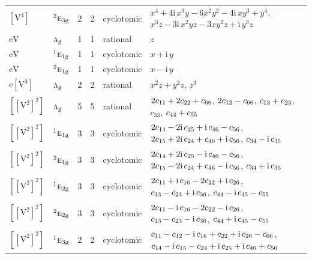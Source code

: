 \documentclass[10pt,a4paper]{article}
\numberwithin{equation}{section}
\newcommand{\irr}[1]{\text{\normalfont\scshape #1}}
\newcommand{\conjpair}[1]{{}^{#1}}
\newcommand{\ptag}[1]{\mathrm{#1}}
\newcommand{\iunit}{\mathrm{i}}
\newcommand{\jahn}[1]{\mathrm{#1}}
\newlength{\fillwidth}\newlength{\cellwidth}\newlength{\colwidth}
\newcommand{\signbreak}{\penalty100\relax}
\begin{document}
{\begin{longtable}{@{}llrrl>{\RaggedRight\arraybackslash}p{\fillwidth}@{}}
$\jahn{[V^{4}]}$ & $\conjpair{2}\irr{e}_{3\ptag{g}}$ & 2 & 2 & cyclotomic & $x^{4} + 4\iunit{}\,x^{3}y - 6x^{2}y^{2} - 4\iunit{}\,xy^{3} + y^{4}$, $x^{3}z - 3\iunit{}\,x^{2}yz - 3xy^{2}z + \iunit{}\,y^{3}z$\\
$\jahn{eV}$ & $\irr{a}_{\ptag{g}}$ & 1 & 1 & rational & $z$\\
$\jahn{eV}$ & $\conjpair{1}\irr{e}_{1\ptag{g}}$ & 1 & 1 & cyclotomic & $x + \iunit{}\,y$\\
$\jahn{eV}$ & $\conjpair{2}\irr{e}_{1\ptag{g}}$ & 1 & 1 & cyclotomic & $x - \iunit{}\,y$\\
$\jahn{e[V^{3}]}$ & $\irr{a}_{\ptag{g}}$ & 2 & 2 & rational & $x^{2}z + y^{2}z$, $z^{3}$\\
$\jahn{[[V^{2}]^{2}]}$ & $\irr{a}_{\ptag{g}}$ & 5 & 5 & rational & $2c_{11} +\signbreak 2c_{22} +\signbreak c_{66}$, $2c_{12} -\signbreak c_{66}$, $c_{13} +\signbreak c_{23}$, $c_{33}$, $c_{44} +\signbreak c_{55}$\\
$\jahn{[[V^{2}]^{2}]}$ & $\conjpair{1}\irr{e}_{1\ptag{g}}$ & 3 & 3 & cyclotomic & $2c_{14} -\signbreak 2\iunit{}\,c_{25} +\signbreak \iunit{}\,c_{46} -\signbreak c_{56}$, $2c_{15} +\signbreak 2\iunit{}\,c_{24} +\signbreak c_{46} +\signbreak \iunit{}\,c_{56}$, $c_{34} -\signbreak \iunit{}\,c_{35}$\\
$\jahn{[[V^{2}]^{2}]}$ & $\conjpair{2}\irr{e}_{1\ptag{g}}$ & 3 & 3 & cyclotomic & $2c_{14} +\signbreak 2\iunit{}\,c_{25} -\signbreak \iunit{}\,c_{46} -\signbreak c_{56}$, $2c_{15} -\signbreak 2\iunit{}\,c_{24} +\signbreak c_{46} -\signbreak \iunit{}\,c_{56}$, $c_{34} +\signbreak \iunit{}\,c_{35}$\\
$\jahn{[[V^{2}]^{2}]}$ & $\conjpair{1}\irr{e}_{2\ptag{g}}$ & 3 & 3 & cyclotomic & $2c_{11} +\signbreak \iunit{}\,c_{16} -\signbreak 2c_{22} +\signbreak \iunit{}\,c_{26}$, $c_{13} -\signbreak c_{23} +\signbreak \iunit{}\,c_{36}$, $c_{44} -\signbreak \iunit{}\,c_{45} -\signbreak c_{55}$\\
$\jahn{[[V^{2}]^{2}]}$ & $\conjpair{2}\irr{e}_{2\ptag{g}}$ & 3 & 3 & cyclotomic & $2c_{11} -\signbreak \iunit{}\,c_{16} -\signbreak 2c_{22} -\signbreak \iunit{}\,c_{26}$, $c_{13} -\signbreak c_{23} -\signbreak \iunit{}\,c_{36}$, $c_{44} +\signbreak \iunit{}\,c_{45} -\signbreak c_{55}$\\
$\jahn{[[V^{2}]^{2}]}$ & $\conjpair{1}\irr{e}_{3\ptag{g}}$ & 2 & 2 & cyclotomic & $c_{11} -\signbreak c_{12} -\signbreak \iunit{}\,c_{16} +\signbreak c_{22} +\signbreak \iunit{}\,c_{26} -\signbreak c_{66}$, $c_{14} -\signbreak \iunit{}\,c_{15} -\signbreak c_{24} +\signbreak \iunit{}\,c_{25} +\signbreak \iunit{}\,c_{46} +\signbreak c_{56}$\\

\end{longtable}}
\end{document}

